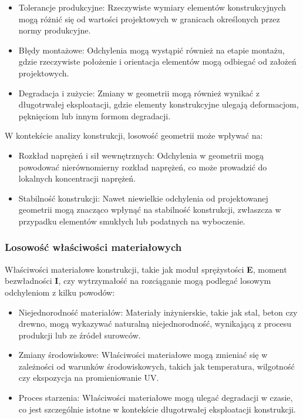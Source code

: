 \begin{itemize}
    \item Tolerancje produkcyjne: Rzeczywiste wymiary elementów konstrukcyjnych mogą różnić się od wartości projektowych w granicach określonych przez normy produkcyjne.
    \item Błędy montażowe: Odchylenia mogą wystąpić również na etapie montażu, gdzie rzeczywiste położenie i orientacja elementów mogą odbiegać od założeń projektowych.
    \item Degradacja i zużycie: Zmiany w geometrii mogą również wynikać z długotrwałej eksploatacji, gdzie elementy konstrukcyjne ulegają deformacjom, pęknięciom lub innym formom degradacji.
\end{itemize}

W kontekście analizy konstrukcji, losowość geometrii może wpływać na:

\begin{itemize}
\item Rozkład naprężeń i sił wewnętrznych: Odchylenia w geometrii mogą powodować nierównomierny rozkład naprężeń, co może prowadzić do lokalnych koncentracji naprężeń.
\item Stabilność konstrukcji: Nawet niewielkie odchylenia od projektowanej geometrii mogą znacząco wpłynąć na stabilność konstrukcji, zwłaszcza w przypadku elementów smukłych lub podatnych na wyboczenie.
\end{itemize}

\subsubsection*{Losowość właściwości materiałowych}

Właściwości materiałowe konstrukcji, takie jak moduł sprężystości \textbf{E}, moment bezwładności \textbf{I}, czy wytrzymałość na rozciąganie \sigma mogą podlegać losowym odchyleniom z kilku powodów:

\begin{itemize}
    \item Niejednorodność materiałów: Materiały inżynierskie, takie jak stal, beton czy drewno, mogą wykazywać naturalną niejednorodność, wynikającą z procesu produkcji lub ze źródeł surowców.
    \item Zmiany środowiskowe: Właściwości materiałowe mogą zmieniać się w zależności od warunków środowiskowych, takich jak temperatura, wilgotność czy ekspozycja na promieniowanie UV.
    \item Proces starzenia: Właściwości materiałowe mogą ulegać degradacji w czasie, co jest szczególnie istotne w kontekście długotrwałej eksploatacji konstrukcji.
\end{itemize}

